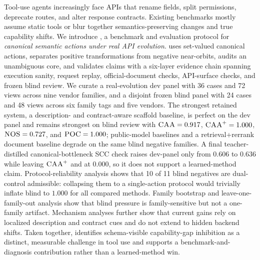 Tool-use agents increasingly face APIs that rename fields, split permissions, deprecate routes, and alter response contracts. Existing benchmarks mostly assume static tools or blur together semantics-preserving changes and true capability shifts. We introduce \toolshift, a benchmark and evaluation protocol for \emph{canonical semantic actions under real API evolution}. \toolshift{} uses set-valued canonical actions, separates positive transformations from negative near-orbits, audits an unambiguous core, and validates claims with a six-layer evidence chain spanning execution sanity, request replay, official-document checks, API-surface checks, and frozen blind review. We curate a real-evolution dev panel with 36 cases and 72 views across nine vendor families, and a disjoint frozen blind panel with 24 cases and 48 views across six family tags and five vendors. The strongest retained system, a description- and contract-aware scaffold baseline, is perfect on the dev panel and remains strongest on blind review with $\textsc{CAA}=0.917$, $\textsc{CAA}^{+}=1.000$, $\textsc{NOS}=0.727$, and $\textsc{POC}=1.000$; public-model baselines and a retrieval+rerrank document baseline degrade on the same blind negative families. A final teacher-distilled canonical-bottleneck SCC check raises dev-panel \NOS{} only from $0.606$ to $0.636$ while leaving $\textsc{CAA}^{+}$ and \POC{} at $0.000$, so it does not support a learned-method claim. Protocol-reliability analysis shows that 10 of 11 blind negatives are dual-control admissible: collapsing them to a single-action protocol would trivially inflate blind \NOS{} to $1.000$ for all compared methods. Family bootstrap and leave-one-family-out analysis show that blind pressure is family-sensitive but not a one-family artifact. Mechanism analyses further show that current gains rely on localized description and contract cues and do not extend to hidden backend shifts. Taken together, \toolshift{} identifies schema-visible capability-gap inhibition as a distinct, measurable challenge in tool use and supports a benchmark-and-diagnosis contribution rather than a learned-method win.
